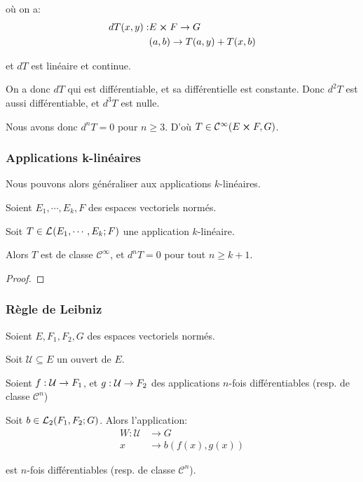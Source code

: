 où on a:
\begin{align*}
	dT(x, y) : & E \cartprod F \rightarrow G \\
	& (a, b) \rightarrow T(a, y) + T(x, b)
\end{align*}

et $dT$ est linéaire et continue.

On a donc $dT$ qui est différentiable, et sa différentielle est constante.
Donc $d^{2}T$ est aussi différentiable, et $d^{3}T$ est nulle.

Nous avons donc $d^{n}T = 0$ pour $n \geq 3$. D'où $T \in
\mathcal{C}^{\infty}(E \cartprod F, G)$.

\subsubsection{Applications k-linéaires}

Nous pouvons alors généraliser aux applications $k$-linéaires.

\begin{proposition}
	Soient $E_{1}, \cdots, E_{k}, F$ des espaces vectoriels normés.

	Soit $T \in \GScontinueHomo{E_{1}, \cdots, E_{k}}{F}$ une application
	$k$-linéaire.

	Alors $T$ est de classe $\mathcal{C}^{\infty}$, et $d^{n}T = 0$ pour tout $n
	\geq k + 1$.
\end{proposition}

\begin{proof}

\end{proof}

\subsubsection{Règle de Leibniz}

\begin{proposition}
	Soient $E, F_{1}, F_{2}, G$ des espaces vectoriels normés.

	Soit $\mathcal{U} \subseteq E$ un ouvert de $E$.

	Soient $\GSfunction{f}{\mathcal{U}}{F_{1}}$, et
	$\GSfunction{g}{\mathcal{U}}{F_{2}}$ des applications $n$-fois différentiables
	(resp. de classe $\mathcal{C}^{n}$)

	Soit $b \in \GScontinueHomo[2]{F_{1}, F_{2}}{G}$.
	Alors l'application:
	\begin{align*}
		W : \mathcal{U} &\rightarrow G \\
			x &\rightarrow b(f(x), g(x))
	\end{align*}

	est $n$-fois différentiables (resp. de classe $\mathcal{C}^{n}$).
\end{proposition}

